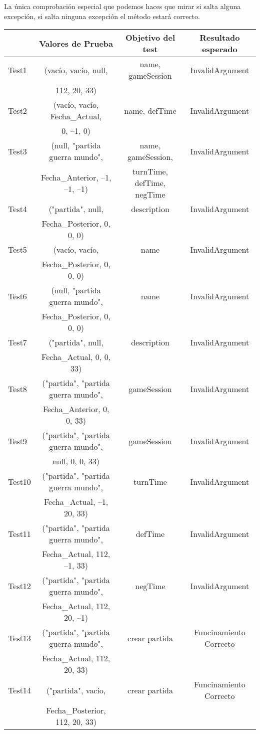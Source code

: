 \begin{enumerate}
La única comprobación especial que podemos haces que mirar si salta alguna excepción, si salta ninguna excepción el método estará correcto.

{\footnotesize
\begin{longtable}[c]{lccc}
 & \textbf{Valores de Prueba} & \textbf{Objetivo del test} & \textbf{Resultado esperado} \\
\hline \hline
\endhead

Test1 & (vacío, vacío, null,  & name, gameSession & InvalidArgument\\
 & 112, 20, 33) & & \\
Test2 & (vacío, vacío, Fecha\_Actual, & name, defTime & InvalidArgument\\
 & 0, --1, 0) & & \\
Test3 & (null, "partida guerra mundo", & name, gameSession, & InvalidArgument\\
 &   Fecha\_Anterior, --1, --1, --1) & turnTime, defTime, negTime & \\
Test4 & ("partida", null,  & description   & InvalidArgument\\
 &  Fecha\_Posterior, 0, 0, 0) & & \\

Test5 & (vacío, vacío,  & name & InvalidArgument\\
 &  Fecha\_Posterior, 0, 0, 0) & & \\
Test6 & (null, "partida guerra mundo",  & name & InvalidArgument\\
 &   Fecha\_Posterior, 0, 0, 0) & & \\
Test7 & ("partida", null,  & description  & InvalidArgument\\
 &  Fecha\_Actual, 0, 0, 33) & & \\
Test8 & ("partida", "partida guerra mundo",  & gameSession & InvalidArgument\\
 &   Fecha\_Anterior, 0, 0, 33) & & \\
Test9 & ("partida", "partida guerra mundo",  & gameSession & InvalidArgument\\
 &   null, 0, 0, 33) & & \\
Test10 & ("partida", "partida guerra mundo",  & turnTime & InvalidArgument\\
 &   Fecha\_Actual, --1, 20, 33) & & \\
Test11 & ("partida", "partida guerra mundo",  & defTime & InvalidArgument\\
 &  Fecha\_Actual, 112, --1, 33) & & \\
Test12 & ("partida", "partida guerra mundo",  & negTime & InvalidArgument\\
 &  Fecha\_Actual, 112, 20, --1) & & \\
Test13 & ("partida", "partida guerra mundo",   & crear partida & Funcinamiento Correcto \\
 &  Fecha\_Actual, 112, 20, 33) & & \\
Test14 & ("partida", vacío,   & crear partida & Funcinamiento Correcto \\
 &  Fecha\_Posterior, 112, 20, 33) & & \\


\end{longtable}}
\end{enumerate}
